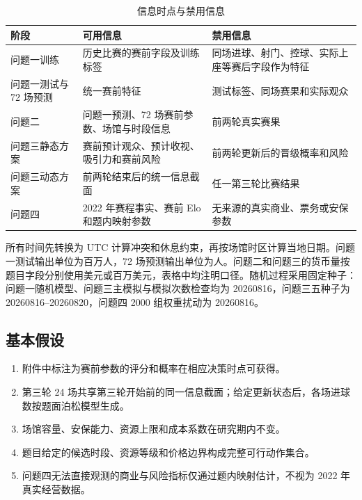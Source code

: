 \begin{longtable}[]{@{}>{\raggedright\arraybackslash}p{}p{}p{}@{}}
\caption{信息时点与禁用信息}\label{tab:information-timing}\\
\toprule\noalign{}
阶段 & 可用信息 & 禁用信息 \\
\midrule\noalign{}
\endhead
\bottomrule\noalign{}
\endlastfoot
问题一训练 & 历史比赛的赛前字段及训练标签 & 同场进球、射门、控球、实际上座等赛后字段作为特征 \\
问题一测试与 72 场预测 & 统一赛前特征 & 测试标签、同场赛果和实际观众 \\
问题二 & 问题一预测、72 场赛前参数、场馆与时段信息 & 前两轮真实赛果 \\
问题三静态方案 & 赛前预计观众、预计收视、吸引力和赛前风险 & 前两轮更新后的晋级概率和风险 \\
问题三动态方案 & 前两轮结束后的统一信息截面 & 任一第三轮比赛结果 \\
问题四 & 2022 年赛程事实、赛前 Elo 和题内映射参数 & 无来源的真实商业、票务或安保参数 \\
\end{longtable}

所有时间先转换为 UTC 计算冲突和休息约束，再按场馆时区计算当地日期。问题一测试输出单位为百万人，72 场预测输出单位为人。问题二和问题三的货币量按题目字段分别使用美元或百万美元，表格中均注明口径。随机过程采用固定种子：问题一随机模型、问题三主模拟与模拟次数检查均为 20260816，问题三五种子为 20260816--20260820，问题四 2000 组权重扰动为 20260816。

\subsection{基本假设}

\begin{enumerate}
\def\labelenumi{\arabic{enumi}.}
\tightlist
\item
  附件中标注为赛前参数的评分和概率在相应决策时点可获得。
\item
  第三轮 24 场共享第三轮开始前的同一信息截面；给定更新状态后，各场进球数按题面泊松模型生成。
\item
  场馆容量、安保能力、资源上限和成本系数在研究期内不变。
\item
  题目给定的候选时段、资源等级和价格边界构成完整可行动作集合。
\item
  问题四无法直接观测的商业与风险指标仅通过题内映射估计，不视为 2022 年真实经营数据。
\end{enumerate}

